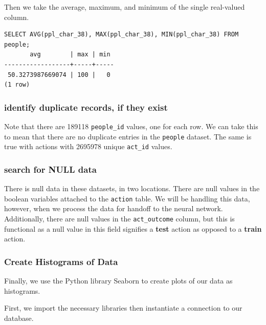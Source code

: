 \documentclass[]{report}
\newenvironment{Shaded}{}{}
\newcommand{\CharTok}[1]{\textcolor[rgb]{0.25,0.44,0.63}{{#1}}}
\newcommand{\StringTok}[1]{\textcolor[rgb]{0.25,0.44,0.63}{{#1}}}
\newcommand{\OtherTok}[1]{\textcolor[rgb]{0.00,0.44,0.13}{{#1}}}
\newcommand{\NormalTok}[1]{{#1}}
\begin{document}
\pagebreak

Then we take the average, maximum, and minimum of the single real-valued
column.

\begin{verbatim}
SELECT AVG(ppl_char_38), MAX(ppl_char_38), MIN(ppl_char_38) FROM people;
       avg        | max | min
------------------+-----+-----
 50.3273987669074 | 100 |   0
(1 row)
\end{verbatim}

\subsubsection{identify duplicate records, if they
exist}\label{identify-duplicate-records-if-they-exist}

Note that there are 189118 \texttt{people\_id} values, one for each row.
We can take this to mean that there are no duplicate entries in the
\texttt{people} dataset. The same is true with actions with 2695978
unique \texttt{act\_id} values.

\subsubsection{search for NULL data}\label{search-for-null-data}

There is null data in these datasets, in two locations. There are null
values in the boolean variables attached to the \texttt{action} table.
We will be handling this data, however, when we process the data for
handoff to the neural network. Additionally, there are null values in
the \texttt{act\_outcome} column, but this is functional as a null value
in this field signifies a \textbf{test} action as opposed to a
\textbf{train} action.

\subsubsection{Create Histograms of
Data}\label{create-histograms-of-data}

Finally, we use the Python library Seaborn to create plots of our data
as histograms.

First, we import the necessary libraries then instantiate a connection
to our database.

\begin{Shaded}
\end{Shaded}
\end{document}
